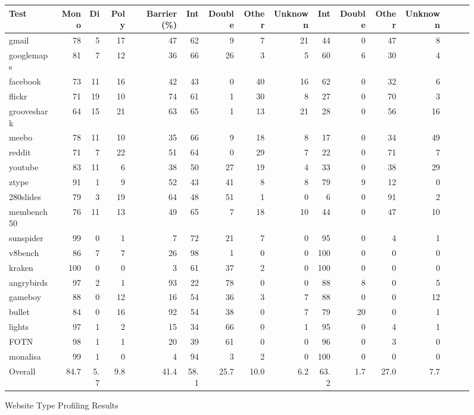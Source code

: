 \begin{figure*}
\begin{tabular}{lrrrrrrrrrrrrrrr}
Test
& Mono & Di & Poly & Barrier (\%)
& Int & Double & Other & Unknown
& Int & Double & Other & Unknown \\
\midrule
gmail          & 78 & 5  & 17 & 47 & 62 & 9  & 7  & 21 & 44 & 0 & 47 & 8 \\
googlemaps     & 81 & 7  & 12 & 36 & 66 & 26 & 3  & 5  & 60 & 6 & 30 & 4 \\
facebook       & 73 & 11 & 16 & 42 & 43 & 0 & 40 & 16 & 62 & 0 & 32 & 6 \\
flickr         & 71 & 19 & 10 & 74 & 61 & 1 & 30 & 8 & 27 & 0 & 70 & 3 \\
grooveshark    & 64 & 15 & 21 & 63 & 65 & 1 & 13 & 21 & 28 & 0 & 56 & 16 \\
meebo          & 78 & 11 & 10 & 35 & 66 & 9 & 18 & 8 & 17 & 0 & 34 & 49 \\
reddit         & 71 & 7 & 22 & 51 & 64 & 0 & 29 & 7 & 22 & 0 & 71 & 7 \\
youtube        & 83 & 11 & 6 & 38 & 50 & 27 & 19 & 4 & 33 & 0 & 38 & 29 \\
ztype          & 91 & 1 & 9 & 52 & 43 & 41 & 8 & 8 & 79 & 9 & 12 & 0 \\
280slides      & 79 & 3 & 19 & 64 & 48 & 51 & 1 & 0 & 6 & 0 & 91 & 2 \\
membench50     & 76 & 11 & 13 & 49 & 65 & 7  & 18 & 10 & 44 & 0 & 47 & 10 \\
\midrule
sunspider      & 99 & 0  & 1  & 7  & 72 & 21 & 7  & 0  & 95 & 0 & 4  & 1  \\
v8bench        & 86 & 7  & 7  & 26 & 98 & 1  & 0  & 0  & 100 & 0 & 0 & 0  \\
kraken         & 100 & 0 & 0  & 3  & 61 & 37 & 2  & 0  & 100 & 0 & 0 & 0  \\
\midrule
angrybirds     & 97 & 2 & 1 & 93 & 22 & 78 & 0 & 0 & 88 & 8 & 0 & 5 \\
gameboy        & 88 & 0 & 12 & 16 & 54 & 36 & 3 & 7 & 88 & 0 & 0 & 12 \\
bullet         & 84 & 0 & 16 & 92 & 54 & 38 & 0 & 7 & 79 & 20 & 0 & 1 \\
lights         & 97 & 1 & 2 & 15 & 34 & 66 & 0 & 1 & 95 & 0 & 4 & 1 \\
FOTN           & 98 & 1 & 1 & 20 & 39 & 61 & 0 & 0 & 96 & 0 & 3 & 0 \\
monalisa       & 99 & 1 & 0 & 4 & 94 & 3 & 2 & 0 & 100 & 0 & 0 & 0 \\
\midrule
Overall        & 84.7 & 5.7 & 9.8 & 41.4 & 58.1 & 25.7 & 10.0 & 6.2 & 63.2 & 1.7 & 27.0 & 7.7 \\
\bottomrule
\end{tabular}
\nocaptionrule \caption{Website Type Profiling Results}
\label{fig:polymorphism}
\end{figure*}

